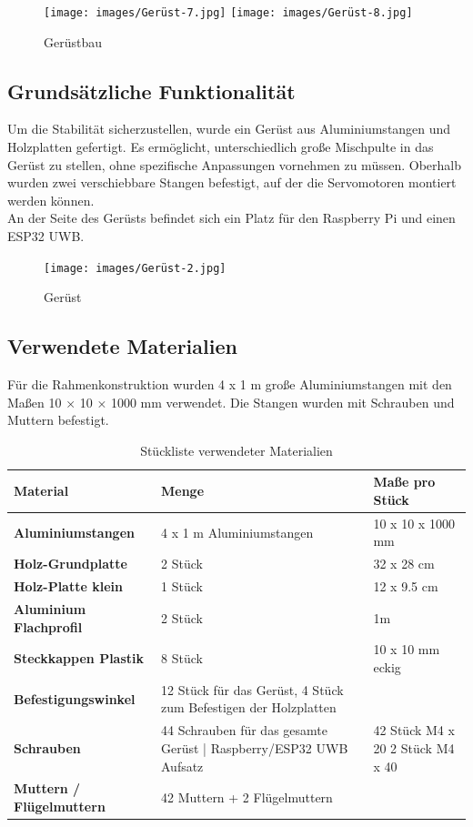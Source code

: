 \begin{figure}[H]
	\centering
	\texttt{[image: images/Gerüst-7.jpg]}
	\texttt{[image: images/Gerüst-8.jpg]}
	\caption[Gerüstbau]{Gerüstbau}
	\label{fig:Gerüstbau}
\end{figure}

\newpage
\subsection{Grundsätzliche Funktionalität}
Um die Stabilität sicherzustellen, wurde ein Gerüst aus Aluminiumstangen und Holzplatten gefertigt. Es ermöglicht, unterschiedlich große Mischpulte in das Gerüst zu stellen, ohne spezifische Anpassungen vornehmen zu müssen. Oberhalb wurden zwei verschiebbare Stangen befestigt, auf der die Servomotoren montiert werden können.\\
An der Seite des Gerüsts befindet sich ein Platz für den Raspberry Pi und einen ESP32 UWB.

\begin{figure}[H]
	\centering
	\texttt{[image: images/Gerüst-2.jpg]}
	\caption[Gerüst]{Gerüst}
	\label{fig:Gerüst-1}
\end{figure}


\newpage
\subsection{Verwendete Materialien}
Für die Rahmenkonstruktion wurden 4 x 1 m große Aluminiumstangen mit den Maßen 10 × 10 × 1000 mm verwendet. Die Stangen wurden mit Schrauben und Muttern befestigt.\\

\begin{table} [H]
	\begin{tabular}{ |p{3.3cm} |p{4.8cm}|p{4.8cm}| }
		\hline
		\textbf{Material} & \textbf{Menge}& \textbf{Maße pro Stück}\\
		\hline
		\textbf{Aluminiumstangen} & 4 x 1 m Aluminiumstangen & 10 x 10 x 1000 mm  \\ 
		\hline
		\textbf{Holz-Grundplatte} & 2 Stück & 32 x 28 cm   \\  
		\hline
		\textbf{Holz-Platte klein} & 1 Stück & 12 x 9.5 cm   \\  
		\hline
		\textbf{Aluminium Flachprofil} & 2 Stück  & 1m \\
		\hline
		\textbf{Steckkappen Plastik} & 8 Stück & 10 x 10 mm eckig  \\
		\hline
		\textbf{Befestigungswinkel}& 12 Stück für das Gerüst, 4 Stück zum Befestigen der Holzplatten   &  \\
		\hline
		\textbf{Schrauben}& 44 Schrauben für das gesamte Gerüst | 	Raspberry/ESP32 UWB Aufsatz & 42 Stück M4 x 20  2 Stück M4 x 40\\
		\hline
		\textbf{Muttern / Flügelmuttern}& 42 Muttern + 2 Flügelmuttern & \\
		\hline	
	\end{tabular}
	\caption{Stückliste verwendeter Materialien} 
\end{table} 



